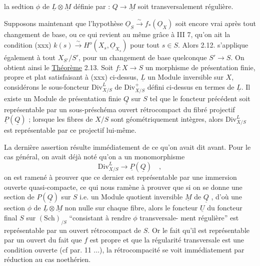 
la sedtion $\phi$ de $\underline{L}\otimes\underline{M}$ définie par \unsure{$\psi$} : $Q\longrightarrow\underline{M}$ soit transversalement
régulière.

Supposons maintenant que l'hypothèse $\underline{O}_S\xrightarrow{\sim}f_*(\underline{O}_X)$ soit encore vrai
après tout changement de base, ou ce qui revient au même grâce à III 7,
qu'on ait la condition
(xxx) \qquad\qquad $k(s)\xrightarrow{\sim}H^o(X_s,\underline{O}_{X_s})$
pour tout $s\in S$. Alors 2.12. s'applique également à tout $X_{S'}/S'$, pour un
changement de base quelconque $S'\rightarrow S$. On obtient ainsi le
\uline{Théorème} 2.13. Soit $f\colon X\longrightarrow S$ un morphisme  de présentation finie,
propre et plat satisfaisant à (xxx) ci-dessus, $\underline{L}$ un Module inversible
sur $X$, considérons le sous-foncteur $\mathrm{Div}^{L}_{X/S}$ de $\mathrm{Div}^{+}_{X/S}$ défini ci-dessus en
termes de $\underline{L}$.  Il existe un Module de présentation finie $\underline{Q}$ sur
$S$ tel que le foncteur précédent soit représentable par un sous-préschéma
ouvert rétrocompact du fibré projectif $\underline{P}(\underline{Q})$ ; lorsque les fibres de $X/S$
sont géométriquement intègres, alors $\mathrm{Div}^{L}_{X/S}$ est représentable par ce
  projectif lui-même.

La dernière assertion résulte immédiatement de ce qu'on avait dit
avant. Pour le cas général, on avait déjà noté qu'on a un monomorphisme
\[
\mathrm{Div}^{L}_{X/S}\longrightarrow\underline{P}(\underline{Q}) \quad ,
\]
on est ramené à prouver que ce dernier est représentable par une immersion
ouverte quasi-compacte, ce qui nous ramène à prouver que si on se donne
une section de $P(\underline{Q})$ sur $S$ i.e. un Module quotient inversible $\underline{M}$ de $\underline{Q}$ ,
d'où une section $\phi$ de $\underline{L}\otimes\underline{M}$ non nulle sur chaque fibre, alors le foncteur
$\underline{U}$ du foncteur final $S$ sur $(\mathrm{Sch})_{/S}$ ``consistant à rendre $\phi$ transversale-
ment régulière'' est représentable par un ouvert rétrocompact de $S$. Or
le fait qu'il est représentable par un ouvert  du fait que $f$ est
propre et que la régularité transversale est une condition ouverte (cf par.
11 ...), la rétrocompacité se voit immédiatement par réduction au cas
noethérien.

